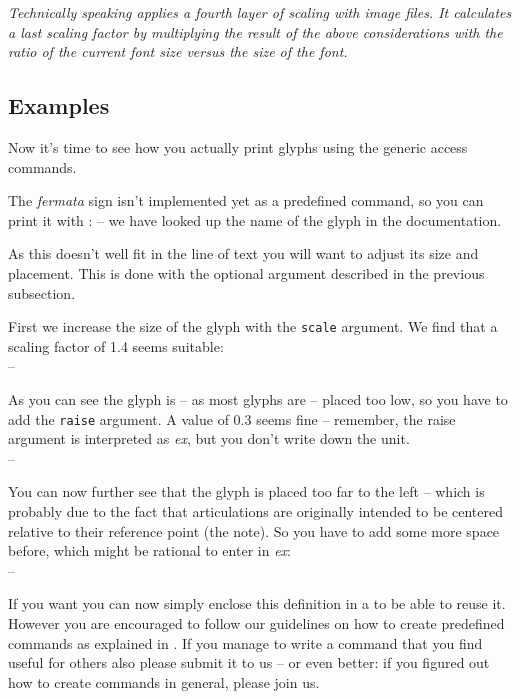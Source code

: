 \documentclass{article}
\begin{document}
\textit{Technically speaking \lilyglyphs applies a fourth layer of scaling with image files.
It calculates a last scaling factor by multiplying the result of the above considerations with the ratio of the current font size versus the size of the  font.}


\subsection{Examples}
\label{subsec:examples}
Now it's time to see how you actually print \emmentaler glyphs using the generic access commands.

The \emph{fermata} sign isn't implemented yet as a predefined command, so you can print it with :  -- we have looked up the name of the glyph in the documentation.
 
As this doesn't well fit in the line of text you will want to adjust its size and placement.
This is done with the optional argument described in the previous subsection.

First we increase the size of the glyph with the \texttt{scale} argument. We find that a scaling factor of 1.4 seems suitable:\\
 -- 

As you can see the glyph is -- as most \emmentaler glyphs are -- placed too low, so you have to add the \texttt{raise} argument. A value of 0.3 seems fine -- remember, the raise argument is interpreted as \emph{ex}, but you don't write down the unit.\\
  -- 
 
You can now further see that the glyph is placed too far to the left -- which is probably due to the fact that articulations are originally intended to be centered relative to their reference point (the note).
So you have to add some more space before, which might be rational to enter in \emph{ex}:\\
 -- \hspace{1ex}

\medskip
If you want you can now simply enclose this definition in a   to be able to reuse it.
However you are encouraged to follow our guidelines on how to create predefined commands as explained in .
If you manage to write a command that you find useful for others also please submit it to us -- or even better: if you figured out how to create commands in general, please join us.
\end{document}
